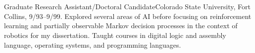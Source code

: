 \section{}
{Graduate Research Assistant/Doctoral Candidate}{Colorado State University,
  Fort Collins, 9/93--9/99. Explored several areas of AI before focusing on
  reinforcement learning and partially observable Markov decision processes
  in the context of robotics for my dissertation. Taught courses in digital
  logic and assembly language, operating systems, and programming
  languages.}
